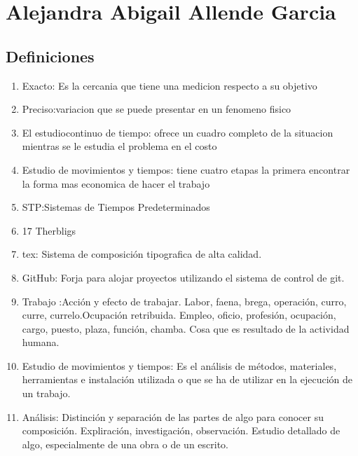 \section{Alejandra Abigail Allende Garcia}
\subsection{Definiciones}

\begin{enumerate}
   
    \item Exacto: Es la cercania que tiene una medicion respecto a su objetivo
 
    \item Preciso:variacion que se puede presentar en un fenomeno fisico
   
    \item El estudiocontinuo de tiempo: ofrece un cuadro completo de la situacion mientras se le estudia el problema en el costo

    \item Estudio de movimientos y tiempos: tiene cuatro etapas la primera encontrar la forma mas economica de hacer el trabajo

    \item  STP:Sistemas de Tiempos Predeterminados

    \item 17 Therbligs
   
\item tex: Sistema de composición tipografica de alta calidad.

  \item GitHub: Forja para alojar proyectos utilizando el sistema de control de git.
  
    \item  Trabajo :Acción y efecto de trabajar.
    Labor, faena, brega, operación, curro, curre, currelo.Ocupación retribuida.
    Empleo, oficio, profesión, ocupación, cargo, puesto, plaza, función, chamba. Cosa que es resultado de la actividad humana.
    
\item Estudio de movimientos y tiempos: Es el análisis de métodos, materiales, herramientas e instalación utilizada o que se ha de utilizar en la ejecución de un trabajo.

\item Análisis: Distinción y separación de las partes de algo para conocer su composición.
    Expliración, investigación, observación.
    Estudio detallado de algo, especialmente de una obra o de un escrito.
    


\end{enumerate}
